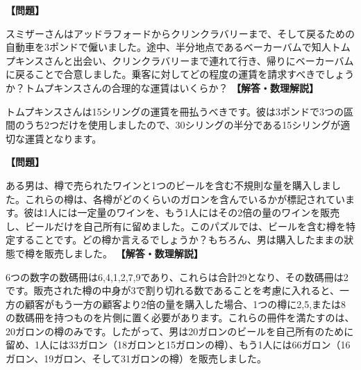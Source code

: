 \documentclass[10pt,a4paper,oneside,openany]{ltjsbook}
\begin{document}
\begin{tcolorbox}[colback=softblue,colframe=primaryblue,title=\textbf{第 75 問：乗客の運賃 （原題: THE PASSENGER'S FARE.）},arc=2mm,boxrule=1pt,breakable]
\textbf{【問題】}\par\vspace{0.3em}
スミザーさんはアッドラフォードからクリンクラバリーまで、そして戻るための自動車を3ポンドで僱いました。途中、半分地点であるベーカーバムで知人トムプキンスさんと出会い、クリンクラバリーまで連れて行き、帰りにベーカーバムに戻ることで合意しました。乗客に対してどの程度の運賃を請求すべきでしょうか？トムプキンスさんの合理的な運賃はいくらか？
\tcblower
\textbf{【解答・数理解説】}\par\vspace{0.3em}
トムプキンスさんは15シリングの運賃を冊払うべきです。彼は3ポンドで3つの區間のうち2つだけを使用しましたので、30シリングの半分である15シリングが適切な運賃となります。
\end{tcolorbox}

\begin{tcolorbox}[colback=softblue,colframe=primaryblue,title=\textbf{第 76 問：Barrel of Beer の謎 （原題: THE BARREL OF BEER.）},arc=2mm,boxrule=1pt,breakable]
\textbf{【問題】}\par\vspace{0.3em}
ある男は、樽で売られたワインと1つのビールを含む不規則な量を購入しました。これらの樽は、各樽がどのくらいのガロンを含んでいるかが標記されています。彼は1人には一定量のワインを、もう1人にはその2倍の量のワインを販売し、ビールだけを自己所有に留めました。このパズルでは、ビールを含む樽を特定することです。どの樽か言えるでしょうか？もちろん、男は購入したままの狀態で樽を販売しました。
\tcblower
\textbf{【解答・数理解説】}\par\vspace{0.3em}
6つの数字の数碼冊は6,4,1,2,7,9であり、これらは合計29となり、その数碼冊は2です。販売された樽の中身が3で割り切れる数であることを考慮に入れると、一方の顧客がもう一方の顧客より2倍の量を購入した場合、1つの樽に2,5,または8の数碼冊を持つものを片側に置く必要があります。これらの冊件を満たすのは、20ガロンの樽のみです。したがって、男は20ガロンのビールを自己所有のために留め、1人には33ガロン（18ガロンと15ガロンの樽）、もう1人には66ガロン（16ガロン、19ガロン、そして31ガロンの樽）を販売しました。
\end{tcolorbox}
\end{document}
